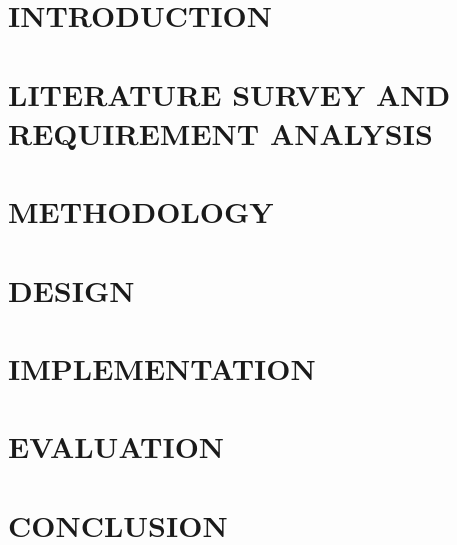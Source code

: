 \documentclass{report}
\begin{document}
	\newpage

	\chapter{INTRODUCTION}
	
	
	\chapter{LITERATURE SURVEY AND REQUIREMENT ANALYSIS}
	
	
	\chapter{METHODOLOGY}
	
	
	\chapter{DESIGN}
	
	
	\chapter{IMPLEMENTATION}
	
	
	\chapter{EVALUATION}
	
	
	\chapter{CONCLUSION}
	
	
	
	
	
	\cleardoublepage
	\appendix
\end{document}
